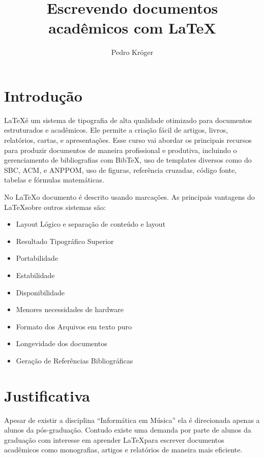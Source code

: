 \documentclass[12pt,brazil]{article}
\begin{document}

\title{Escrevendo documentos acadêmicos com \LaTeX}
\author{Pedro Kröger}
\maketitle

\thispagestyle{empty}

\section{Introdução}

\LaTeX é um sistema de tipografia de alta qualidade otimizado para
documentos estruturados e acadêmicos. Ele permite a criação fácil de
artigos, livros, relatórios, cartas, e apresentações. Esse curso vai
abordar os principais recursos para produzir documentos de maneira
profissional e produtiva, incluindo o gerenciamento de bibliografias
com BibTeX, uso de templates diversos como do SBC, ACM, e ANPPOM, uso
de figuras, referência cruzadas, código fonte, tabelas e fórmulas
matemáticas.

No \LaTeX o documento é descrito usando marcações. As principais
vantagens do \LaTeX sobre outros sistemas são:

\begin{itemize}
\item Layout Lógico e separação de conteúdo e layout
\item Resultado Tipográfico Superior
\item Portabilidade
\item Estabilidade
\item Disponibilidade
\item Menores necessidades de hardware
\item Formato dos Arquivos em texto puro
\item Longevidade dos documentos
\item Geração de Referências Bibliográficas
\end{itemize}

\section{Justificativa}

Apesar de existir a disciplina ``Informática em Música'' ela é
direcionada apenas a alunos da pós-graduação. Contudo existe uma
demanda por parte de alunos da graduação com interesse em aprender
\LaTeX para escrever documentos acadêmicos como monografias, artigos e
relatórios de maneira mais eficiente.
\end{document}
